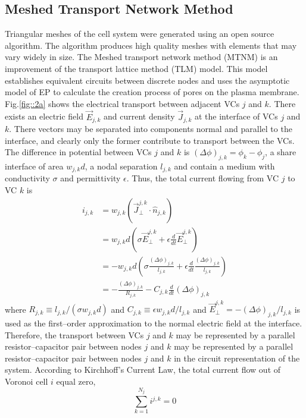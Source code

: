 \documentclass[conference]{IEEEtran}
\begin{document}
\subsection{Meshed Transport Network Method}
Triangular meshes of the cell system were generated using an open source algorithm. The algorithm produces high quality meshes with elements that may vary widely in size. The Meshed transport network method (MTNM) is an improvement of the transport lattice method (TLM) model\cite{gowrishankar2003approach, stewart2004transport}. This model establishes equivalent circuits between discrete nodes and uses the asymptotic model of EP to calculate the creation process of pores on the plasma membrane. Fig.\ref{fig::2a} shows the electrical transport between adjacent VCs $j$ and $k$. There exists an electric field $\vec{E}_{j,k}$ and current density $\vec{J}_{j,k}$ at the interface of VCs $j$ and $k$. There vectors may be separated into components normal and parallel to the interface, and clearly only the former contribute to transport between the VCs. The difference in potential between VCs $j$ and $k$ is $\left ( \Delta \phi  \right ) _{j,k}=\phi _k-\phi_j$, a share interface of area $w_{j,k}d$, a nodal separation $l_{j,k}$ and contain a medium with conductivity $\sigma$ and permittivity $\epsilon$. Thus, the total current flowing from VC $j$ to VC $k$ is 
	\begin{equation}
	\begin{split}
		i_{j,k} &= w_{j,k}(\vec{J}^{j,k}_{\bot }\cdot \hat{n}_{j,k})\\
		&= w_{j,k}d(\sigma \vec{E}^{j,k}_{\bot} + \epsilon \frac{d}{dt}\vec{E}^{j,k}_{\bot })\\
		&= -w_{j,k}d(\sigma \frac{(\Delta \phi)_{j,k}}{l_{j,k}} + \epsilon \frac{d}{dt} \frac{(\Delta \phi)_{j,k}}{l_{j,k}})\\
		&= -\frac{\left ( \Delta \phi  \right )_{j,k}}{R_{j,k}} - C_{j,k} \frac{d}{dt}\left ( \Delta \phi  \right )_{j,k}   
	\end{split}
	\end{equation}
where $R_{j,k}\equiv l_{j,k}/(\sigma w_{j,k}d)$ and $C_{j,k}\equiv \epsilon w_{j,k}d/l_{j,k}$ and $\vec{E}^{j,k}_\bot = -(\Delta \phi)_{j,k}/l_{j,k}$ is used as the first--order approximation to the normal electric field at the interface. Therefore, the transport between VCs $j$ and $k$ may be represented by a parallel resistor--capacitor pair between nodes $j$ and $k$ may be represented by a parallel resistor--capacitor pair between nodes $j$ and $k$ in the circuit representation of the system. According to Kirchhoff's Current Law, the total current flow out of Voronoi cell $i$ equal zero,
\begin{equation}
	\sum_{k=1}^{N_j}i^{j,k} = 0
\end{equation}
\end{document}
